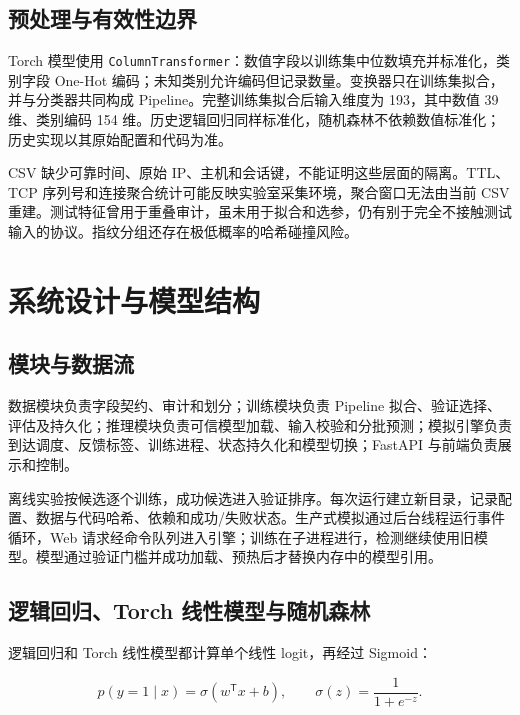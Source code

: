 \documentclass[UTF8,a4paper,11pt,fontset=fandol]{ctexart}
\begin{document}
\subsection{预处理与有效性边界}\label{ux9884ux5904ux7406ux4e0eux6709ux6548ux6027ux8fb9ux754c}

Torch 模型使用
\texttt{ColumnTransformer}：数值字段以训练集中位数填充并标准化，类别字段
One-Hot
编码；未知类别允许编码但记录数量。变换器只在训练集拟合，并与分类器共同构成
Pipeline。完整训练集拟合后输入维度为 193，其中数值 39 维、类别编码 154
维。历史逻辑回归同样标准化，随机森林不依赖数值标准化；历史实现以其原始配置和代码为准。

CSV 缺少可靠时间、原始
IP、主机和会话键，不能证明这些层面的隔离。TTL、TCP
序列号和连接聚合统计可能反映实验室采集环境，聚合窗口无法由当前 CSV
重建。测试特征曾用于重叠审计，虽未用于拟合和选参，仍有别于完全不接触测试输入的协议。指纹分组还存在极低概率的哈希碰撞风险。

\section{系统设计与模型结构}\label{ux7cfbux7edfux8bbeux8ba1ux4e0eux6a21ux578bux7ed3ux6784}

\subsection{模块与数据流}\label{ux6a21ux5757ux4e0eux6570ux636eux6d41}

数据模块负责字段契约、审计和划分；训练模块负责 Pipeline
拟合、验证选择、评估及持久化；推理模块负责可信模型加载、输入校验和分批预测；模拟引擎负责到达调度、反馈标签、训练进程、状态持久化和模型切换；FastAPI
与前端负责展示和控制。

离线实验按候选逐个训练，成功候选进入验证排序。每次运行建立新目录，记录配置、数据与代码哈希、依赖和成功/失败状态。生产式模拟通过后台线程运行事件循环，Web
请求经命令队列进入引擎；训练在子进程进行，检测继续使用旧模型。模型通过验证门槛并成功加载、预热后才替换内存中的模型引用。

\subsection{逻辑回归、Torch
线性模型与随机森林}\label{ux903bux8f91ux56deux5f52torch-ux7ebfux6027ux6a21ux578bux4e0eux968fux673aux68eeux6797}

逻辑回归和 Torch 线性模型都计算单个线性 logit，再经过 Sigmoid：

\[p(y=1\mid x)=\sigma(w^\mathsf{T}x+b),\qquad \sigma(z)=\frac{1}{1+e^{-z}}.\]
\end{document}
